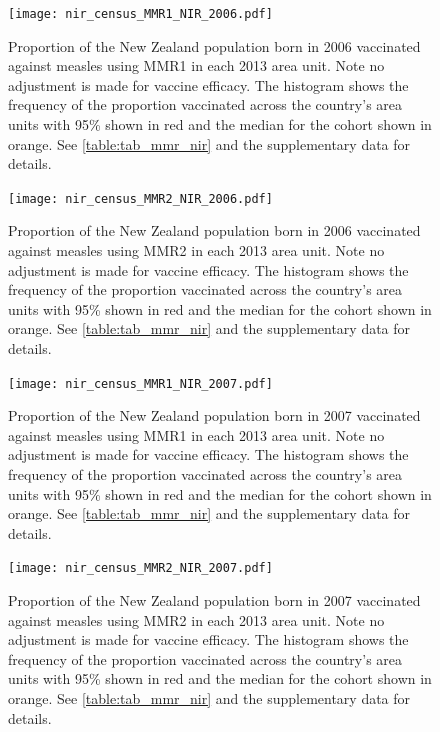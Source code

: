 \documentclass{article}
\begin{document}
\begin{figure}
   \begin{center}
    \texttt{[image: nir\_census\_MMR1\_NIR\_2006.pdf]}
    \end{center}
    \caption{Proportion of the New Zealand population born in 2006 vaccinated against measles using MMR1 in each 2013 area unit. Note no adjustment is made for vaccine efficacy. The histogram shows the frequency of the proportion vaccinated across the country's area units with 95\% shown in red and the median for the cohort shown in orange. See \autoref{table:tab_mmr_nir} and the supplementary data for details.}
\label{fig:fig12006}
\end{figure}



\begin{figure}
\begin{center}
\texttt{[image: nir\_census\_MMR2\_NIR\_2006.pdf]}
\end{center}
    \caption{Proportion of the New Zealand population born in 2006 vaccinated against measles using MMR2 in each 2013 area unit. Note no adjustment is made for vaccine efficacy. The histogram shows the frequency of the proportion vaccinated across the country's area units with 95\% shown in red and the median for the cohort shown in orange. See \autoref{table:tab_mmr_nir} and the supplementary data for details.}
\label{fig:fig22006}
\end{figure}


\begin{figure}
\begin{center}
\texttt{[image: nir\_census\_MMR1\_NIR\_2007.pdf]}
\end{center}
    \caption{Proportion of the New Zealand population born in 2007 vaccinated against measles using MMR1 in each 2013 area unit. Note no adjustment is made for vaccine efficacy. The histogram shows the frequency of the proportion vaccinated across the country's area units with 95\% shown in red and the median for the cohort shown in orange. See \autoref{table:tab_mmr_nir} and the supplementary data for details.}
\label{fig:fig12007}
\end{figure}


\begin{figure}
\begin{center}
    \texttt{[image: nir\_census\_MMR2\_NIR\_2007.pdf]}
\end{center}
    \caption{Proportion of the New Zealand population born in 2007 vaccinated against measles using MMR2 in each 2013 area unit. Note no adjustment is made for vaccine efficacy. The histogram shows the frequency of the proportion vaccinated across the country's area units with 95\% shown in red and the median for the cohort shown in orange. See \autoref{table:tab_mmr_nir} and the supplementary data for details.}
\label{fig:fig22007}
\end{figure}
\end{document}
